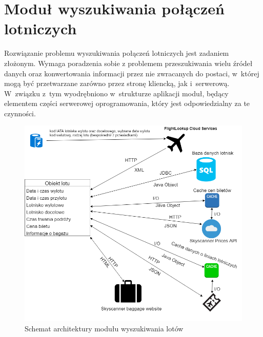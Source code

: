 \documentclass[12pt, twoside]{report}
\begin{document}
\section{Moduł wyszukiwania połączeń lotniczych}
Rozwiązanie problemu wyszukiwania połączeń lotniczych jest zadaniem złożonym. Wymaga poradzenia sobie z problemem przeszukiwania wielu źródeł danych oraz konwertowania informacji przez nie zwracanych do postaci, w~której mogą być przetwarzane zarówno przez stronę kliencką, jak i~serwerową. W~związku z~tym wyodrębniono w~strukturze aplikacji moduł, będący elementem części serwerowej oprogramowania, który jest odpowiedzialny za te czynności.

\begin{figure}[!ht]
\centering
\includegraphics[scale=0.50, keepaspectratio]{search_module.png}
\caption{Schemat architektury modułu wyszukiwania lotów}
\label{fig:search_module}
\end{figure}
\end{document}
